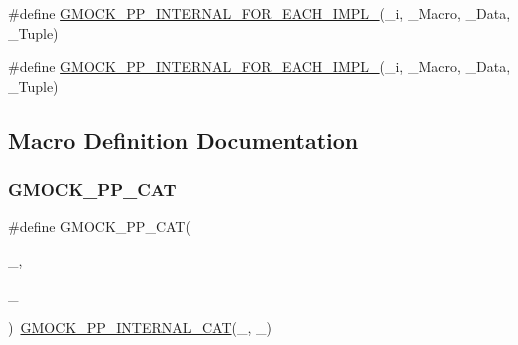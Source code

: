 \begin{DoxyCompactItemize}
\#define \mbox{\hyperlink{_obj__test_2lib_2googletest-master_2googlemock_2include_2gmock_2internal_2gmock-pp_8h_a73de321e9dd5117fdd32520525296b60}{G\+M\+O\+C\+K\+\_\+\+P\+P\+\_\+\+I\+N\+T\+E\+R\+N\+A\+L\+\_\+\+F\+O\+R\+\_\+\+E\+A\+C\+H\+\_\+\+I\+M\+P\+L\+\_}}(\+\_\+i,  \+\_\+\+Macro,  \+\_\+\+Data,  \+\_\+\+Tuple)
\item 
\#define \mbox{\hyperlink{_obj__test_2lib_2googletest-master_2googlemock_2include_2gmock_2internal_2gmock-pp_8h_ab9670ce2eb23a136b2978041d6f36f1b}{G\+M\+O\+C\+K\+\_\+\+P\+P\+\_\+\+I\+N\+T\+E\+R\+N\+A\+L\+\_\+\+F\+O\+R\+\_\+\+E\+A\+C\+H\+\_\+\+I\+M\+P\+L\+\_}}(\+\_\+i,  \+\_\+\+Macro,  \+\_\+\+Data,  \+\_\+\+Tuple)
\end{DoxyCompactItemize}


\subsection{Macro Definition Documentation}
\mbox{\label{_obj__test_2lib_2googletest-master_2googlemock_2include_2gmock_2internal_2gmock-pp_8h_a108c52ffa81ab99348d23b8fa76fded3}} 
\subsubsection{\texorpdfstring{GMOCK\_PP\_CAT}{GMOCK\_PP\_CAT}}
{\footnotesize\ttfamily \#define G\+M\+O\+C\+K\+\_\+\+P\+P\+\_\+\+C\+AT(\begin{DoxyParamCaption}\item[{}]{\+\_,  }\item[{}]{\+\_ }\end{DoxyParamCaption})~\mbox{\hyperlink{_obj__test_2lib_2googletest-master_2googlemock_2include_2gmock_2internal_2gmock-pp_8h_a2b034c776c832e3d951f5d123658a7ba}{G\+M\+O\+C\+K\+\_\+\+P\+P\+\_\+\+I\+N\+T\+E\+R\+N\+A\+L\+\_\+\+C\+AT}}(\+\_, \+\_)}

\mbox{\label{_obj__test_2lib_2googletest-master_2googlemock_2include_2gmock_2internal_2gmock-pp_8h_a44870968c9989ec20c90812361e21a55}} 
